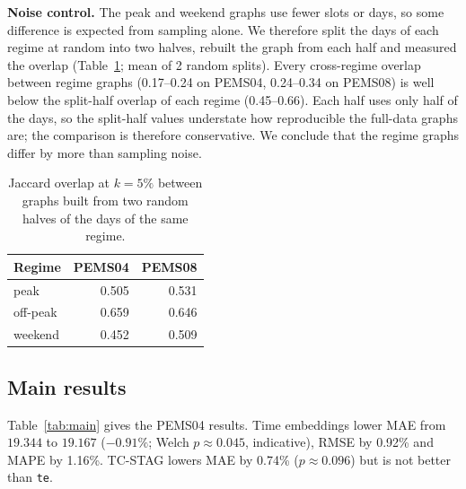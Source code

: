 \documentclass[conference]{IEEEtran}
\begin{document}
\textbf{Noise control.} The peak and weekend graphs use fewer slots or days, so some difference is expected from sampling alone. We therefore split the days of each regime at random into two halves, rebuilt the graph from each half and measured the overlap (Table~\ref{tab:split}; mean of 2 random splits). Every cross-regime overlap between regime graphs (0.17--0.24 on PEMS04, 0.24--0.34 on PEMS08) is well below the split-half overlap of each regime (0.45--0.66). Each half uses only half of the days, so the split-half values understate how reproducible the full-data graphs are; the comparison is therefore conservative. We conclude that the regime graphs differ by more than sampling noise.
\begin{table}[t]
\centering\caption{Jaccard overlap at $k=5\%$ between graphs built from two random halves of the days of the same regime.}\label{tab:split}
\footnotesize
\begin{tabular}{@{}lrr@{}}
\toprule
Regime & PEMS04 & PEMS08\\
\midrule
peak & 0.505 & 0.531\\
off-peak & 0.659 & 0.646\\
weekend & 0.452 & 0.509\\
\bottomrule
\end{tabular}
\end{table}

\subsection{Main results}\label{sec:main}
Table~\ref{tab:main} gives the PEMS04 results. Time embeddings lower MAE from $19.344$ to $19.167$ ($-0.91\%$; Welch $p\approx0.045$, indicative), RMSE by 0.92\% and MAPE by 1.16\%. TC-STAG lowers MAE by 0.74\% ($p\approx0.096$) but is not better than \texttt{te}.
\begin{table}[t]
\centering\caption{Main results on PEMS04 (3 seeds, mean $\pm$ SD; percentages are changes against our DSTAGNN).}\label{tab:main}
\footnotesize
{}
\end{table}
\end{document}

